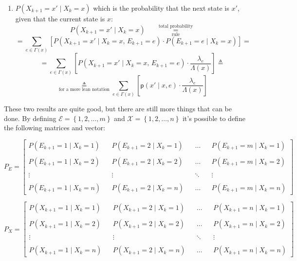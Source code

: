 \documentclass[12pt,a4paper]{article}
\newcommand*{\transp}{\mathsf{p}}
\begin{document}
\begin{enumerate}
\item $P(X_{k+1}=x' \mid X_k=x)$ which is the probability that the next state is $x'$, given that the current state is $x$:
$$
P(X_{k+1}=x' \mid X_k=x) \hspace{20pt}\underset{\textrm{rule}}{\overset{\textrm{total probability}}{=}}
$$
$$
=\sum_{e\in \Gamma(x)}{
\left[
P\left(
X_{k+1}=x' \mid X_k=x\textrm{, }E_{k+1}=e
\right)\cdot
P\left(
E_{k+1}=e \mid X_k=x
\right)
\right]
}=
$$
$$
=
\sum_{e\in \Gamma(x)}{
\left[
P\left(
X_{k+1}=x' \mid X_k=x\textrm{, }E_{k+1}=e
\right)\cdot
\frac{\lambda_e}{\Lambda(x)}
\right]}\triangleq
$$
$$
\underset{\textrm{for a more lean notation}}{\triangleq}
\sum_{e\in \Gamma(x)}{
\left[
\transp\left(x' \mid x,e
\right)\cdot
\frac{\lambda_e}{\Lambda(x)}
\right]}
$$
\end{enumerate}
These two results are quite good, but there are still more things that can be done. By defining 
$\mathcal{E}=\left\lbrace 1,2,\dots,m \right\rbrace$ and 
$\mathcal{X}=\left\lbrace 1,2,\dots,n \right\rbrace$
it's possible to define the following matrices and vector:

\bigskip
$$
P_E=
\left[
\begin{matrix}
P\left(E_{k+1}=1  \mid  X_k=1\right)&&
P\left(E_{k+1}=2  \mid  X_k=1\right)&&
\dots&&
P\left(E_{k+1}=m  \mid  X_k=1\right)\\\\
P\left(E_{k+1}=1  \mid  X_k=2\right)&&
P\left(E_{k+1}=2  \mid  X_k=2\right)&&
\dots&&
P\left(E_{k+1}=m  \mid  X_k=2\right)\\\\
\vdots&&
\vdots&&
\ddots&&
\vdots\\\\
P\left(E_{k+1}=1  \mid  X_k=n\right)&&
P\left(E_{k+1}=2  \mid  X_k=n\right)&&
\dots&&
P\left(E_{k+1}=m  \mid  X_k=n\right)
\end{matrix}
\right]
$$

\bigskip
$$
P_X=
\left[
\begin{matrix}
P\left(X_{k+1}=1  \mid  X_k=1\right)&&
P\left(X_{k+1}=2  \mid  X_k=1\right)&&
\dots&&
P\left(X_{k+1}=n  \mid  X_k=1\right)\\\\
P\left(X_{k+1}=1  \mid  X_k=2\right)&&
P\left(X_{k+1}=2  \mid  X_k=2\right)&&
\dots&&
P\left(X_{k+1}=n  \mid  X_k=2\right)\\\\
\vdots&&
\vdots&&
\ddots&&
\vdots\\\\
P\left(X_{k+1}=1  \mid  X_k=n\right)&&
P\left(X_{k+1}=2  \mid  X_k=n\right)&&
\dots&&
P\left(X_{k+1}=n  \mid  X_k=n\right)
\end{matrix}
\right]
$$
\end{document}
